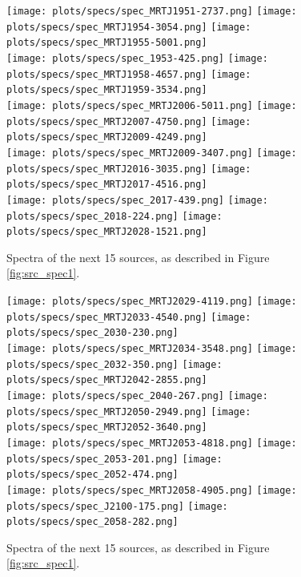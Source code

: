 \documentclass[preprint]{aastex}
\begin{document}
\begin{figure}\centering
\texttt{[image: plots/specs/spec\_MRTJ1951-2737.png]}
\texttt{[image: plots/specs/spec\_MRTJ1954-3054.png]}
\texttt{[image: plots/specs/spec\_MRTJ1955-5001.png]}\\
\texttt{[image: plots/specs/spec\_1953-425.png]}
\texttt{[image: plots/specs/spec\_MRTJ1958-4657.png]}
\texttt{[image: plots/specs/spec\_MRTJ1959-3534.png]}\\
\texttt{[image: plots/specs/spec\_MRTJ2006-5011.png]}
\texttt{[image: plots/specs/spec\_MRTJ2007-4750.png]}
\texttt{[image: plots/specs/spec\_MRTJ2009-4249.png]}\\
\texttt{[image: plots/specs/spec\_MRTJ2009-3407.png]}
\texttt{[image: plots/specs/spec\_MRTJ2016-3035.png]}
\texttt{[image: plots/specs/spec\_MRTJ2017-4516.png]}\\
\texttt{[image: plots/specs/spec\_2017-439.png]}
\texttt{[image: plots/specs/spec\_2018-224.png]}
\texttt{[image: plots/specs/spec\_MRTJ2028-1521.png]}\\
\caption{Spectra of the next 15 sources, as described in Figure \ref{fig:src_spec1}.
}\label{fig:src_spec26}
\end{figure}\clearpage

\begin{figure}\centering
\texttt{[image: plots/specs/spec\_MRTJ2029-4119.png]}
\texttt{[image: plots/specs/spec\_MRTJ2033-4540.png]}
\texttt{[image: plots/specs/spec\_2030-230.png]}\\
\texttt{[image: plots/specs/spec\_MRTJ2034-3548.png]}
\texttt{[image: plots/specs/spec\_2032-350.png]}
\texttt{[image: plots/specs/spec\_MRTJ2042-2855.png]}\\
\texttt{[image: plots/specs/spec\_2040-267.png]}
\texttt{[image: plots/specs/spec\_MRTJ2050-2949.png]}
\texttt{[image: plots/specs/spec\_MRTJ2052-3640.png]}\\
\texttt{[image: plots/specs/spec\_MRTJ2053-4818.png]}
\texttt{[image: plots/specs/spec\_2053-201.png]}
\texttt{[image: plots/specs/spec\_2052-474.png]}\\
\texttt{[image: plots/specs/spec\_MRTJ2058-4905.png]}
\texttt{[image: plots/specs/spec\_J2100-175.png]}
\texttt{[image: plots/specs/spec\_2058-282.png]}\\
\caption{Spectra of the next 15 sources, as described in Figure \ref{fig:src_spec1}.
}\label{fig:src_spec27}
\end{figure}\clearpage
\end{document}
